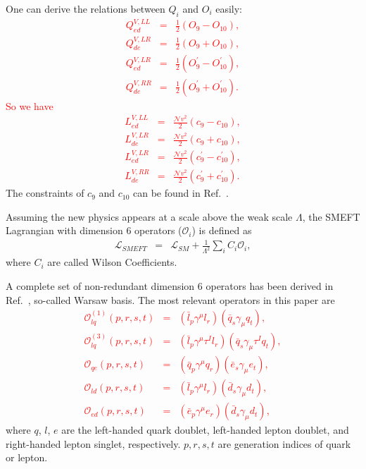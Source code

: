 \documentclass[a4paper,11pt]{article}
\begin{document}
One can derive the relations between $Q_i$ and $O_i$ easily:
\textcolor{red}{
\begin{eqnarray}
  Q^{V,LL}_{ed} &=& \frac{1}{2}\left(O_9-O_{10}\right),  \\
  Q^{V,LR}_{de} &=& \frac{1}{2}\left(O_9+O_{10}\right),  \\
  Q^{V,LR}_{ed} &=& \frac{1}{2}\left(O^{\prime}_9-O^{\prime}_{10}\right),  \\
  Q^{V,RR}_{de} &=& \frac{1}{2}\left(O^{\prime}_9+O^{\prime}_{10}\right).   
\end{eqnarray}
So we have 
\begin{eqnarray}
  L^{V,LL}_{ed} &=& \frac{\mathcal{N}v^2}{2}(c_9-c_{10}),  \\
  L^{V,LR}_{de} &=& \frac{\mathcal{N}v^2}{2}(c_9+c_{10}),  \\
  L^{V,LR}_{ed} &=& \frac{\mathcal{N}v^2}{2}(c^{\prime}_9-c^{\prime}_{10}),  \\
  L^{V,RR}_{de} &=& \frac{\mathcal{N}v^2}{2}(c^{\prime}_9+c^{\prime}_{10}). 
\end{eqnarray}
}
The constraints of $c_9$ and $c_{10}$ can be found in Ref.~\cite{Altmannshofer:2021qrr}.

Assuming the new physics appears at a scale above the weak scale $\Lambda$, 
the SMEFT Lagrangian with dimension 6 operators ($\mathcal{O}_i$) is defined as
\begin{eqnarray}
  \mathcal{L}_{SMEFT} &=& \mathcal{L}_{SM} + \frac{1}{\Lambda^2}\sum_{i}C_i\mathcal{O}_i,  
\end{eqnarray}
where $C_i$ are called Wilson Coefficients.

A complete set of non-redundant dimension 6 operators has been derived in Ref.~\cite{Grzadkowski:2010es}, so-called Warsaw basis. 
The most relevant operators in this paper are
\textcolor{red}{
\begin{eqnarray}
   \mathcal{O}^{(1)}_{lq}(p,r,s,t) &=& (\bar{l}_p\gamma^\mu l_r)(\bar{q}_s\gamma_\mu q_{t}),  \label{O1lq} \\ 
   \mathcal{O}^{(3)}_{lq}(p,r,s,t) &=& (\bar{l}_p\gamma^\mu\tau^I l_r)(\bar{q}_s\gamma_\mu\tau^I q_{t}),  \label{O3lq} \\ 
   \mathcal{O}_{qe}(p,r,s,t) &=& (\bar{q}_p\gamma^\mu q_r)(\bar{e}_s\gamma_\mu e_t), \label{Oqe} \\
   \mathcal{O}_{ld}(p,r,s,t) &=& (\bar{l}_p\gamma^\mu l_r)(\bar{d}_s\gamma_\mu d_t), \label{Old} \\
   \mathcal{O}_{ed}(p,r,s,t) &=& (\bar{e}_p\gamma^\mu e_r)(\bar{d}_s\gamma_\mu d_t), \label{Oed} 
\end{eqnarray}
}
where $q$, $l$, $e$ are the left-handed quark doublet, left-handed lepton doublet, and right-handed lepton singlet, respectively. 
$p,r,s,t$ are generation indices of quark or lepton.
\end{document}
